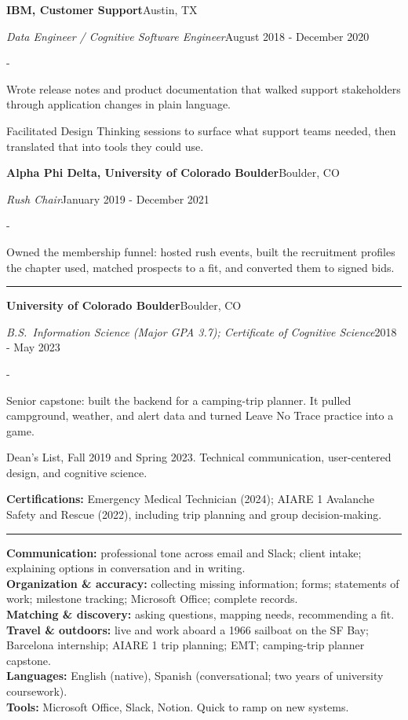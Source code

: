 \documentclass[10pt,letterpaper]{article}
\newenvironment{cvitems}{%
  \begin{list}{-}{%
    \setlength{\leftmargin}{12pt}%
    \setlength{\itemsep}{1.2pt}%
    \setlength{\parsep}{0pt}%
    \setlength{\topsep}{1.5pt}%
    \setlength{\partopsep}{0pt}%
    \setlength{\labelwidth}{6pt}%
    \setlength{\labelsep}{6pt}%
    \setlength{\itemindent}{0pt}%
  }%
}{\end{list}}
\newcommand{\cvsection}[1]{%
  \vspace{7pt}%
  \noindent{\bfseries\fontsize{11pt}{13pt}\selectfont\MakeUppercase{#1}}\par
  \vspace{1pt}%
  \noindent\rule{\textwidth}{0.4pt}\par
  \vspace{4pt}%
}
\newcommand{\cventryhead}[4]{%
  \noindent\textbf{#1}\hfill#2\par
  \vspace{0.5pt}%
  \noindent\textit{#3}\hfill#4\par
}
\newcommand{\cveduhead}[4]{%
  \noindent\textbf{#1}\hfill#2\par
  \vspace{0.5pt}%
  \noindent\textit{#3}\hfill#4\par
}
\begin{document}
\vspace{5pt}
\cventryhead{IBM, Customer Support}{Austin, TX}
{Data Engineer / Cognitive Software Engineer}{August 2018 - December 2020}
\begin{cvitems}
  \item Wrote release notes and product documentation that walked support stakeholders through application changes in plain language.
  \item Facilitated Design Thinking sessions to surface what support teams needed, then translated that into tools they could use.
\end{cvitems}

\vspace{5pt}
\cventryhead{Alpha Phi Delta, University of Colorado Boulder}{Boulder, CO}
{Rush Chair}{January 2019 - December 2021}
\begin{cvitems}
  \item Owned the membership funnel: hosted rush events, built the recruitment profiles the chapter used, matched prospects to a fit, and converted them to signed bids.
\end{cvitems}

\cvsection{Education}

\cveduhead{University of Colorado Boulder}{Boulder, CO}
{B.S.\ Information Science (Major GPA 3.7); Certificate of Cognitive Science}{2018 - May 2023}
\begin{cvitems}
  \item Senior capstone: built the backend for a camping-trip planner. It pulled campground, weather, and alert data and turned Leave No Trace practice into a game.
  \item Dean's List, Fall 2019 and Spring 2023. Technical communication, user-centered design, and cognitive science.
\end{cvitems}

\vspace{5pt}
\noindent\textbf{Certifications:} Emergency Medical Technician (2024); AIARE 1 Avalanche Safety and Rescue (2022), including trip planning and group decision-making.

\cvsection{Skills}

\noindent\textbf{Communication:} professional tone across email and Slack; client intake; explaining options in conversation and in writing.\\[2pt]
\noindent\textbf{Organization \& accuracy:} collecting missing information; forms; statements of work; milestone tracking; Microsoft Office; complete records.\\[2pt]
\noindent\textbf{Matching \& discovery:} asking questions, mapping needs, recommending a fit.\\[2pt]
\noindent\textbf{Travel \& outdoors:} live and work aboard a 1966 sailboat on the SF Bay; Barcelona internship; AIARE 1 trip planning; EMT; camping-trip planner capstone.\\[2pt]
\noindent\textbf{Languages:} English (native), Spanish (conversational; two years of university coursework).\\[2pt]
\noindent\textbf{Tools:} Microsoft Office, Slack, Notion. Quick to ramp on new systems.
\end{document}
